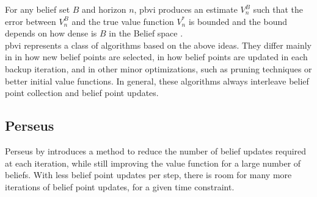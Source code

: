 For any belief set $B$ and horizon $n$, \gls{pbvi} produces an estimate \(V_{n}^{B}\) such that the 
error between \(V_{n}^{B}\) and the true value function \(V^*_{n}\) is bounded and the bound 
depends on how dense is $B$ in the Belief space \cite{10.5555/1630659.1630806}. \\

\gls{pbvi} represents a class of algorithms based on the above ideas. They differ mainly in 
in how new belief points are selected, in how belief points are updated in each
backup iteration, and in other minor optimizations, such as pruning techniques
or better initial value functions. 
In general, these algorithms always interleave belief point collection and belief point updates.

\subsection{Perseus}
Perseus by \cite{Spaan_2005} introduces a method to reduce the number of belief updates required at each iteration,
while still improving the value function for a large number of beliefs. With less belief point 
updates per step, there is room for many more iterations of belief point updates, for a given 
time constraint. 


    

